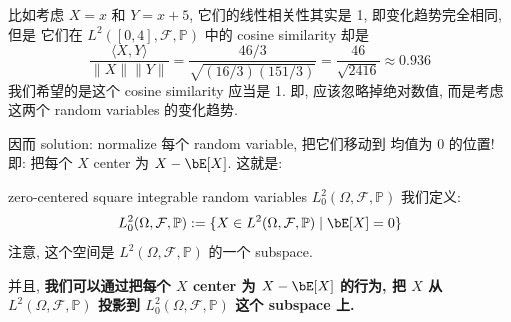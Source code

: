 比如考虑 $X=x$ 和 $Y=x+5$, 它们的线性相关性其实是 1, 即变化趋势完全相同, 但是
它们在 $L^2([0,4], \mathcal{F}, \mathbb{P})$ 中的 cosine similarity 却是
$$
\frac{\langle X, Y \rangle}{\|X\|\|Y\|} =
\frac{46 / 3}{\sqrt{(16 / 3)(151 / 3)}}=\frac{46}{\sqrt{2416}} \approx 0.936
$$
我们希望的是这个 cosine similarity 应当是 1. 
即, 应该忽略掉绝对数值, 而是考虑这两个 random variables 的变化趋势. 

因而 solution: normalize 每个 random variable, 把它们移动到
均值为 0 的位置! 即: 把每个 $X$ center 为 $X-\bE[X]$. 这就是:
\begin{definition}{zero-centered square integrable random variables $L^2_0(\Omega, \mathcal{F}, \mathbb{P})$}
我们定义:
$$
L^2_0(\Omega, \mathcal{F}, \mathbb{P}) := \{X \in L^2(\Omega, \mathcal{F}, \mathbb{P}) \mid \bE[X] = 0\}
$$    
注意, 这个空间是 $L^2(\Omega, \mathcal{F}, \mathbb{P})$ 的一个 subspace.
\end{definition}



并且, \textbf{我们可以通过把每个 $X$ center 为 $X-\bE[X]$ 的行为,
把 $X$ 从 $L^2(\Omega, \mathcal{F}, \mathbb{P})$ 投影到
$L^2_0(\Omega, \mathcal{F}, \mathbb{P})$ 这个 subspace 上. }\\


